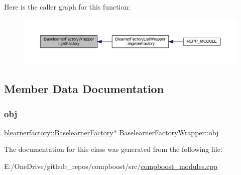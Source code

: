 Here is the caller graph for this function\+:\nopagebreak
\begin{figure}[H]
\begin{center}
\leavevmode
\includegraphics[width=350pt]{class_baselearner_factory_wrapper_ac32811bfb4833aab5d11c7c303070485_icgraph}
\end{center}
\end{figure}


\subsection{Member Data Documentation}
\mbox{\label{class_baselearner_factory_wrapper_a6dc7067dc7a33b29e81bb527b1acfb23}} 
\subsubsection{\texorpdfstring{obj}{obj}}
{\footnotesize\ttfamily \mbox{\hyperlink{classblearnerfactory_1_1_baselearner_factory}{blearnerfactory\+::\+Baselearner\+Factory}}$\ast$ Baselearner\+Factory\+Wrapper\+::obj\hspace{0.3cm}{\ttfamily [protected]}}



The documentation for this class was generated from the following file\+:\begin{DoxyCompactItemize}
\item 
E\+:/\+One\+Drive/github\+\_\+repos/compboost/src/\mbox{\hyperlink{compboost__modules_8cpp}{compboost\+\_\+modules.\+cpp}}\end{DoxyCompactItemize}

